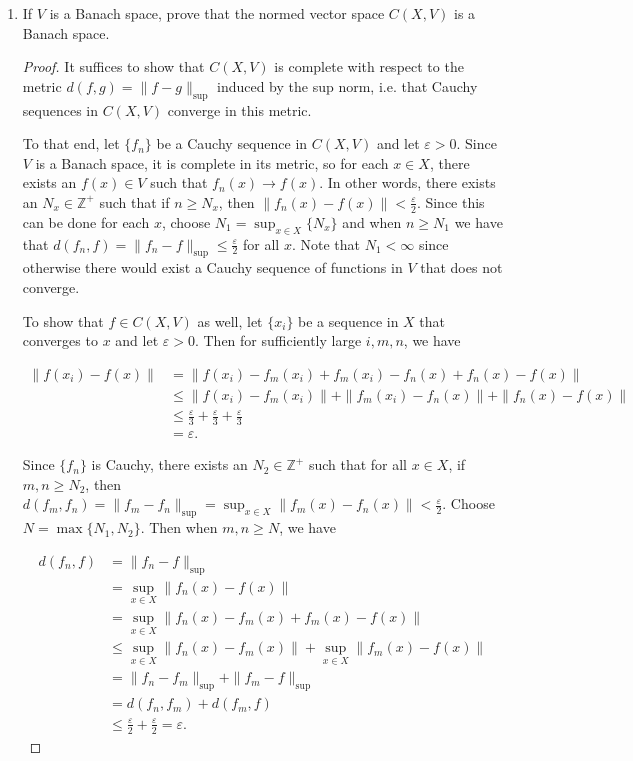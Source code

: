 \documentclass[11pt,oneside,english]{amsart}
\theoremstyle{definition}
\newcommand{\ve}{\varepsilon}
\newcommand{\MB}[1]{\mathbb{#1}}
\begin{document}
\begin{enumerate}
\begin{enumerate}
\pagebreak

\item If $V$ is a Banach space, prove that the normed vector space $C(X,V)$ is a Banach space.

\begin{proof}
It suffices to show that $C(X,V)$ is complete with respect to the metric $d(f,g)=\|f-g\|_{\sup}$ induced by the sup norm, i.e. that Cauchy sequences in $C(X,V)$ converge in this metric.

To that end, let $\{f_n\}$ be a Cauchy sequence in $C(X,V)$ and let $\ve> 0$. Since $V$ is a Banach space, it is complete in its metric, so for each $x\in X$, there exists an $f(x)\in  V$ such that $f_n(x)\rightarrow f(x)$. In other words, there exists an $N_x\in \MB{Z}^+$ such that if $n\geq N_x$, then $\|f_n(x)-f(x)\|<\frac{\ve}{2}$. Since this can be done for each $x$, choose $N_1=\sup_{x\in X}\{N_x\}$ and when $n\geq N_1$ we have that $d(f_n,f)=\|f_n-f\|_{\sup}\leq\frac{\ve}{2}$ for all $x$. Note that $N_1<\infty$ since otherwise there would exist a Cauchy sequence of functions in $V$ that does not converge.


To show that $f\in C(X,V)$ as well, let $\{x_i\}$ be a sequence in $X$ that converges to $x$ and let $\ve>0$. Then for sufficiently large $i,m,n$, we have

\begin{align*}
\|f(x_i)-f(x)\|&=\|f(x_i)-f_m(x_i)+f_m(x_i)-f_n(x)+f_n(x)-f(x)\|\\[2mm]
&\leq \|f(x_i)-f_m(x_i)\|+\|f_m(x_i)-f_n(x)\|+\|f_n(x)-f(x)\|\\[2mm]
&\leq \frac{\ve}{3}+\frac{\ve}{3}+\frac{\ve}{3}\\[2mm]
&=\ve.
\end{align*}


Since $\{f_n\}$ is Cauchy, there exists an $N_2\in \MB{Z}^+$ such that for all $x\in X$, if $m,n\geq N_2$, then $d(f_m,f_n)=\|f_m-f_n\|_{\sup}=\sup_{x\in X}\|f_m(x)-f_n(x)\|<\frac{\ve}{2}$. Choose $N=\max\{N_1,N_2\}$. Then when $m,n\geq N$, we have

\begin{align*}
d(f_n,f)&=\|f_n -f\|_{\sup}\\[2mm]
&=\sup_{x\in X}\|f_n(x)-f(x)\|\\[2mm]
&=\sup_{x\in X}\|f_n(x)-f_m(x)+f_m(x)-f(x)\|\\[2mm]
&\leq\sup_{x\in X}\|f_n(x)-f_m(x)\|+\sup_{x\in X}\|f_m(x)-f(x)\|\\[2mm]
&=\|f_n-f_m\|_{\sup}+\|f_m-f\|_{\sup}\\[2mm]
&=d(f_n,f_m)+d(f_m,f)\\[2mm]
&\leq\frac{\ve}{2}+\frac{\ve}{2}=\ve.
\end{align*}


\end{proof}
\end{enumerate}
\end{enumerate}
\end{document}
